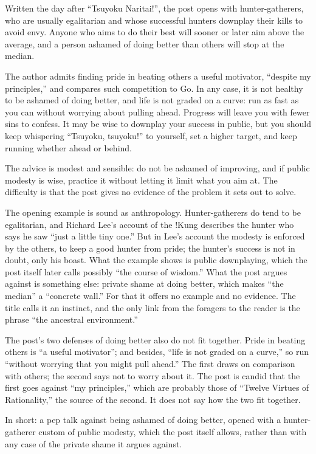\begin{afterword}
\summaryhead

Written the day after ``Tsuyoku Naritai!'', the post opens with hunter-gatherers, who are usually egalitarian and whose successful hunters downplay their kills to avoid envy. Anyone who aims to do their best will sooner or later aim above the average, and a person ashamed of doing better than others will stop at the median.

The author admits finding pride in beating others a useful motivator, ``despite my principles,'' and compares such competition to Go. In any case, it is not healthy to be ashamed of doing better, and life is not graded on a curve: run as fast as you can without worrying about pulling ahead. Progress will leave you with fewer sins to confess. It may be wise to downplay your success in public, but you should keep whispering ``Tsuyoku, tsuyoku!'' to yourself, set a higher target, and keep running whether ahead or behind.

\responsehead

The advice is modest and sensible: do not be ashamed of improving, and if public modesty is wise, practice it without letting it limit what you aim at. The difficulty is that the post gives no evidence of the problem it sets out to solve.

The opening example is sound as anthropology. Hunter-gatherers do tend to be egalitarian, and Richard Lee's account of the !Kung describes the hunter who says he saw ``just a little tiny one.'' But in Lee's account the modesty is enforced by the others, to keep a good hunter from pride; the hunter's success is not in doubt, only his boast. What the example shows is public downplaying, which the post itself later calls possibly ``the course of wisdom.'' What the post argues against is something else: private shame at doing better, which makes ``the median'' a ``concrete wall.'' For that it offers no example and no evidence. The title calls it an instinct, and the only link from the foragers to the reader is the phrase ``the ancestral environment.''

The post's two defenses of doing better also do not fit together. Pride in beating others is ``a useful motivator''; and besides, ``life is not graded on a curve,'' so run ``without worrying that you might pull ahead.'' The first draws on comparison with others; the second says not to worry about it. The post is candid that the first goes against ``my principles,'' which are probably those of ``Twelve Virtues of Rationality,'' the source of the second. It does not say how the two fit together.

In short: a pep talk against being ashamed of doing better, opened with a hunter-gatherer custom of public modesty, which the post itself allows, rather than with any case of the private shame it argues against.
\end{afterword}

